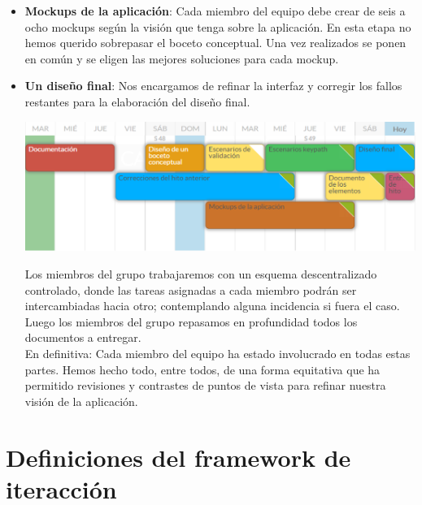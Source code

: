 \documentclass[12pt]{article}
\begin{document}
\begin{itemize}
\item \textbf{Mockups de la aplicación}: Cada miembro del equipo debe crear de seis a ocho mockups según la visión que tenga sobre la aplicación. En esta etapa no hemos querido sobrepasar el boceto conceptual. Una vez realizados se ponen en común y se eligen las mejores soluciones para cada mockup.

\item \textbf{Un diseño final}: Nos encargamos de refinar la interfaz y corregir los fallos restantes para la elaboración del diseño final.


\begin{center}
	\includegraphics[width=1\textwidth]{planificacionHito3.png}
\end{center}
\phantom{10}

\indent Los miembros del grupo trabajaremos con un esquema descentralizado controlado, donde las tareas asignadas a cada miembro podrán ser intercambiadas hacia otro; contemplando alguna incidencia si fuera el caso. Luego los miembros del grupo repasamos en profundidad todos los documentos a entregar. \\ \-
\indent En definitiva: Cada miembro del equipo ha estado involucrado en todas estas partes. Hemos hecho todo, entre todos, de una forma equitativa que ha permitido revisiones y contrastes de puntos de vista para refinar nuestra visión de la aplicación.

\end{itemize}
\newpage


\section{Definiciones del  framework  de iteracción}
\end{document}

